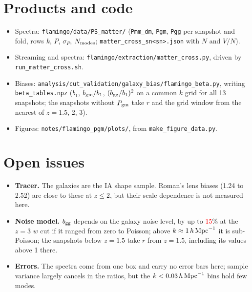 \documentclass[11pt]{article}
\newcommand{\hMpc}{\,h\,{\rm Mpc}^{-1}}
\newcommand{\Pgm}{P_{\rm gm}}
\newcommand{\bgm}{b_{\rm gm}}
\newcommand{\bgg}{b_{\rm gg}}
\newif\ifnumbersfinal
\newcommand{\refresh}[1]{\ifnumbersfinal#1\else\textcolor{red}{#1}\fi}
\newcommand{\ShotWC}{\refresh{15}}
\begin{document}
\section{Products and code}

\begin{sloppypar}
\begin{itemize}
\item Spectra: \texttt{flamingo/data/PS\_matter/} (\texttt{Pmm\_dm}, \texttt{Pgm},
  \texttt{Pgg} per snapshot and fold, rows $k$, $P$, $\sigma_P$, $N_{\rm modes}$;
  \texttt{matter\_cross\_sn<sn>.json} with $N$ and $V/N$).
\item Streaming and spectra: \texttt{flamingo/extraction/matter\_cross.py}, driven
  by \texttt{run\_matter\_cross.sh}.
\item Biases: \texttt{analysis/cut\_validation/galaxy\_bias/flamingo\_beta.py},
  writing \texttt{beta\_tables.npz} ($b_1$, $\bgm/b_1$, $(\bgg/b_1)^2$ on a
  common $k$ grid for all 13 snapshots; the snapshots without $\Pgm$ take $r$
  and the grid window from the nearest of $z = 1.5$, 2, 3).
\item Figures: \texttt{notes/flamingo\_pgm/plots/}, from
  \texttt{make\_figure\_data.py}.
\end{itemize}
\end{sloppypar}

\section{Open issues}

\begin{itemize}
\item \textbf{Tracer.} The galaxies are the IA shape sample. Roman's lens
  biases (1.24 to 2.52) are close to these at $z \le 2$, but their scale
  dependence is not measured here.
\item \textbf{Noise model.} $\bgg$ depends on the galaxy noise level, by up to
  \ShotWC\% at the $z = 3$ $w$ cut if it ranged from zero to Poisson; above
  $k \approx 1\hMpc$ it is sub-Poisson; the snapshots below $z = 1.5$ take
  $r$ from $z = 1.5$, including its values above 1 there.
\item \textbf{Errors.} The spectra come from one box and carry no error bars
  here; sample variance largely cancels in the ratios, but the $k < 0.03\hMpc$
  bins hold few modes.
\end{itemize}
\end{document}
